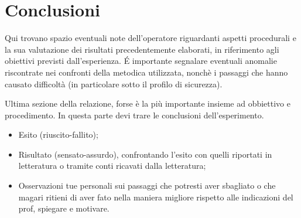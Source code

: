 \section{Conclusioni}
Qui trovano spazio eventuali note dell'operatore riguardanti aspetti procedurali e la sua valutazione dei risultati precedentemente elaborati, in riferimento agli obiettivi previsti dall'esperienza. \'E importante segnalare eventuali anomalie riscontrate nei confronti della metodica utilizzata, nonchè i passaggi che hanno causato difficoltà (in particolare sotto il profilo di sicurezza).

Ultima sezione della relazione, forse è la più importante insieme ad obbiettivo e procedimento. In questa parte devi trare le conclusioni dell'esperimento. 
\begin{itemize}
    \item Esito (riuscito-fallito);
    \item Risultato (sensato-assurdo), confrontando l'esito con quelli riportati in letteratura o tramite conti ricavati dalla letteratura;
    \item Osservazioni tue personali sui passaggi che potresti aver sbagliato o che magari ritieni di aver fato nella maniera migliore rispetto alle indicazioni del prof, spiegare e motivare.
\end{itemize}